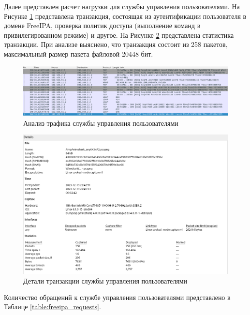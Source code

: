 \documentclass[14pt, a4paper]{extarticle}
\numberwithin{equation}{section}
\begin{document}
Далее представлен расчет нагрузки для службы управления пользователями.
На Рисунке \ref{fig:wireshark_freeipa_dump} представлена транзакция, состоящая из аутентификации пользователя в домене
FreeIPA, проверка политик доступа (выполнение команд в привилегированном режиме) и другое.
На Рисунке \ref{fig:wireshark_freeipa_stats_dump} представлена статистика транзакции. При анализе выяснено, что транзакция состоит
из 258 пакетов, максимальный размер пакета файловой 20448 бит.

\begin{figure}[H]
        \centering
        \includegraphics[scale=0.5]{freeipa_wireshark.png}
        \caption{Анализ трафика службы управления пользователями}
        \label{fig:wireshark_freeipa_dump}
\end{figure}
\begin{figure}[H]
        \centering
        \includegraphics[scale=0.7]{freeipa_wireshark_stats.png}
        \caption{Детали транзакции службы управления пользователями}
        \label{fig:wireshark_freeipa_stats_dump}
\end{figure}

Количество обращений к службе управления пользователями представлено в Таблице \ref{table:freeipa_requests}.
\end{document}
